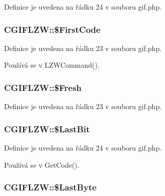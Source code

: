Definice je uvedena na řádku 24 v souboru gif.\-php.

\hypertarget{class_c_g_i_f_l_z_w_af53567e4f02eec8490b182d4d7d3b215}{
\subsubsection[{\$\-First\-Code}]{\setlength{\rightskip}{0pt plus 5cm}C\-G\-I\-F\-L\-Z\-W\-::\$\-First\-Code}}\label{class_c_g_i_f_l_z_w_af53567e4f02eec8490b182d4d7d3b215}


Definice je uvedena na řádku 23 v souboru gif.\-php.



Používá se v L\-Z\-W\-Command().

\hypertarget{class_c_g_i_f_l_z_w_ad89ee46e21a2ea13fcdeffd422d6ac52}{
\subsubsection[{\$\-Fresh}]{\setlength{\rightskip}{0pt plus 5cm}C\-G\-I\-F\-L\-Z\-W\-::\$\-Fresh}}\label{class_c_g_i_f_l_z_w_ad89ee46e21a2ea13fcdeffd422d6ac52}


Definice je uvedena na řádku 23 v souboru gif.\-php.

\hypertarget{class_c_g_i_f_l_z_w_ab1aaf260e0a6b6a1ec08d1837d6256c5}{
\subsubsection[{\$\-Last\-Bit}]{\setlength{\rightskip}{0pt plus 5cm}C\-G\-I\-F\-L\-Z\-W\-::\$\-Last\-Bit}}\label{class_c_g_i_f_l_z_w_ab1aaf260e0a6b6a1ec08d1837d6256c5}


Definice je uvedena na řádku 24 v souboru gif.\-php.



Používá se v Get\-Code().

\hypertarget{class_c_g_i_f_l_z_w_aff79bffa0202cba726df5d7609e6fa55}{
\subsubsection[{\$\-Last\-Byte}]{\setlength{\rightskip}{0pt plus 5cm}C\-G\-I\-F\-L\-Z\-W\-::\$\-Last\-Byte}}\label{class_c_g_i_f_l_z_w_aff79bffa0202cba726df5d7609e6fa55}


